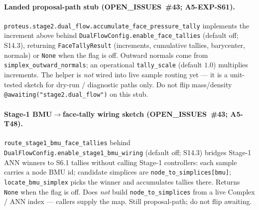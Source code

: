 \documentclass[11pt]{article}
\begin{document}
\paragraph{Landed proposal-path stub (OPEN\_ISSUES~\#43; A5-EXP-S61).}
\texttt{proteus.stage2.dual\_flow.accumulate\_face\_pressure\_tally} implements
the increment above behind
\texttt{DualFlowConfig.enable\_face\_tallies} (default off; S14.3), returning
\texttt{FaceTallyResult} (increments, cumulative tallies, barycenter, normals)
or \texttt{None} when the flag is off. Outward normals come from
\texttt{simplex\_outward\_normals}; an operational \texttt{tally\_scale}
(default $1.0$) multiplies increments. The helper is \emph{not} wired into
live sample routing yet --- it is a unit-tested sketch for dry-run / diagnostic
paths only. Do not flip mass/density
\texttt{@awaiting("stage2.dual\_flow")} on this stub.

\paragraph{Stage-1 BMU$\to$face-tally wiring sketch (OPEN\_ISSUES~\#43; A5-T48).}
\texttt{route\_stage1\_bmu\_face\_tallies} behind
\texttt{DualFlowConfig.enable\_stage1\_bmu\_wiring} (default off; S14.3)
bridges Stage-1 ANN winners to S6.1 tallies without calling Stage-1
controllers: each sample carries a node BMU id; candidate simplices are
\texttt{node\_to\_simplices[bmu]}; \texttt{locate\_bmu\_simplex} picks the
winner and accumulates tallies there. Returns \texttt{None} when the flag is
off. Does \emph{not} build \texttt{node\_to\_simplices} from a live Complex /
ANN index --- callers supply the map. Still proposal-path; do not flip
awaiting.
\end{document}
